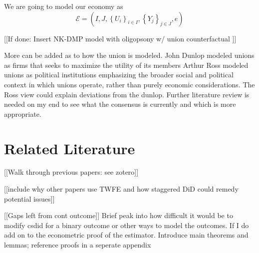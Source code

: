 We are going to model our economy as
\[
\mathcal{E}=\left( I, J,\left\{U_i\right\}_{i \in I},\left\{Y_j\right\}_{j \in J}, e\right)
\]






[[If done: Insert NK-DMP model with oligopsony w/ union counterfactual ]]

More can be added as to how the union is modeled.
John Dunlop modeled unions as firms that seeks to maximize the utility of its members
Arthur Ross modeled unions as political institutions emphasizing the broader social and political context in which unions operate, rather than purely economic considerations. 
The Ross view could explain deviations from the dunlop. 
Further literature review is needed on my end to see what the consensus is currently and which is more appropriate.

\section{Related Literature}
[[Walk through previous papers: see zotero]]

[[include why other papers use TWFE and how staggered DiD could remedy potential issues]]

[[Gaps left from cont outcome]]
Brief peak into how difficult it would be to modify csdid for a binary outcome or other ways to model the outcomes.
If I do add on to the econometric proof of the estimator.
Introduce main theorems and lemmas; reference proofs in a seperate appendix



